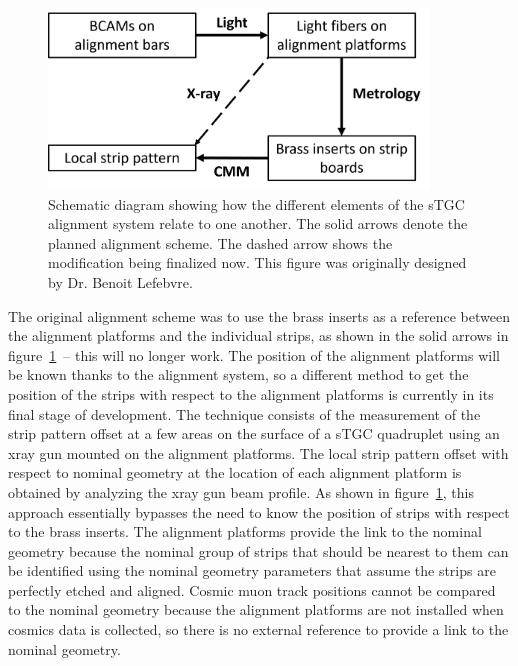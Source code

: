 \begin{figure}
    \centering
    \includegraphics[width = 0.9\textwidth]{figures/alignment_system_element_relations.png}
    \caption{Schematic diagram showing how the different elements of the sTGC alignment system relate to one another. The solid arrows denote the planned alignment scheme. The dashed arrow shows the modification being finalized now. This figure was originally designed by Dr. Benoit Lefebvre.}
    \label{fig:alignment_elements}
\end{figure}

The original alignment scheme was to use the brass inserts as a reference between the alignment platforms and the individual strips, as shown in the solid arrows in figure~\ref{fig:alignment_elements}~-- this will no longer work. The position of the alignment platforms will be known thanks to the alignment system, so a different method to get the position of the strips with respect to the alignment platforms is currently in its final stage of development. The technique consists of the measurement of the strip pattern offset at a few areas on the surface of a sTGC quadruplet using an xray gun mounted on the alignment platforms. The local strip pattern offset with respect to nominal geometry at the location of each alignment platform is obtained by analyzing the xray gun beam profile. As shown in figure~\ref{fig:alignment_elements}, this approach essentially bypasses the need to know the position of strips with respect to the brass inserts. The alignment platforms provide the link to the nominal geometry because the nominal group of strips that should be nearest to them can be identified using the nominal geometry parameters that assume the strips are perfectly etched and aligned. Cosmic muon track positions cannot be compared to the nominal geometry because the alignment platforms are not installed when cosmics data is collected, so there is no external reference to provide a link to the nominal geometry.

